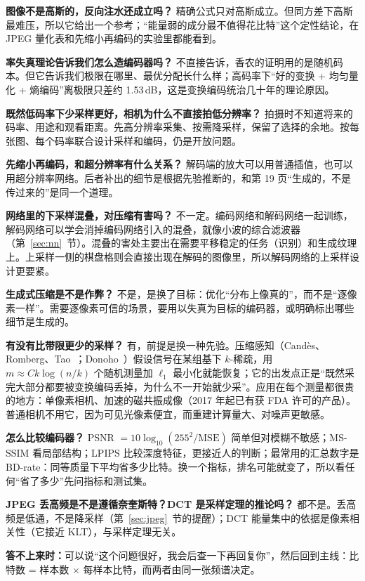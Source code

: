 \textbf{图像不是高斯的，反向注水还成立吗？}
精确公式只对高斯成立。但同方差下高斯最难压，所以它给出一个参考；“能量弱的成分最不值得花比特”这个定性结论，在 JPEG 量化表和先缩小再编码的实验里都能看到。

\textbf{率失真理论告诉我们怎么造编码器吗？}
不直接告诉，香农的证明用的是随机码本。但它告诉我们极限在哪里、最优分配长什么样；高码率下“好的变换 + 均匀量化 + 熵编码”离极限只差约 1.53\,dB，这是变换编码统治几十年的理论原因。

\textbf{既然低码率下少采样更好，相机为什么不直接拍低分辨率？}
拍摄时不知道将来的码率、用途和观看距离。先高分辨率采集、按需降采样，保留了选择的余地。按每张图、每个码率联合设计采样和编码，仍是开放问题。

\textbf{先缩小再编码，和超分辨率有什么关系？}
解码端的放大可以用普通插值，也可以用超分辨率网络。后者补出的细节是根据先验推断的，和第 19 页“生成的，不是传过来的”是同一个道理。

\textbf{网络里的下采样混叠，对压缩有害吗？}
不一定。编码网络和解码网络一起训练，解码网络可以学会消掉编码网络引入的混叠，就像小波的综合滤波器（第~\ref{sec:nn}~节）。混叠的害处主要出在需要平移稳定的任务（识别）和生成纹理上。上采样一侧的棋盘格则会直接出现在解码的图像里，所以解码网络的上采样设计更要紧。

\textbf{生成式压缩是不是作弊？}
不是，是换了目标：优化“分布上像真的”，而不是“逐像素一样”。需要逐像素可信的场景，要用以失真为目标的编码器，或明确标出哪些细节是生成的。

\textbf{有没有比带限更少的采样？}
有，前提是换一种先验。压缩感知（Candès、Romberg、Tao~\cite{candes2006}；Donoho~\cite{donoho2006}）假设信号在某组基下 $k$-稀疏，用 $m\approx Ck\log(n/k)$ 个随机测量加 $\ell_1$ 最小化就能恢复；它的出发点正是“既然采完大部分都要被变换编码丢掉，为什么不一开始就少采”。应用在每个测量都很贵的地方：单像素相机、加速的磁共振成像（2017 年起已有获 FDA 许可的产品）。普通相机不用它，因为可见光像素便宜，而重建计算量大、对噪声更敏感。

\textbf{怎么比较编码器？}
PSNR $=10\log_{10}(255^2/\mathrm{MSE})$ 简单但对模糊不敏感；MS-SSIM 看局部结构；LPIPS 比较深度特征，更接近人的判断；最常用的汇总数字是 BD-rate：同等质量下平均省多少比特。换一个指标，排名可能就变了，所以看任何“省了多少”先问指标和测试集。

\textbf{JPEG 丢高频是不是遵循奈奎斯特？DCT 是采样定理的推论吗？}
都不是。丢高频是低通，不是降采样（第~\ref{sec:jpeg}~节的提醒）；DCT 能量集中的依据是像素相关性（它接近 KLT），与采样定理无关。

\textbf{答不上来时：}可以说“这个问题很好，我会后查一下再回复你”，然后回到主线：比特数 = 样本数 $\times$ 每样本比特，而两者由同一张频谱决定。

